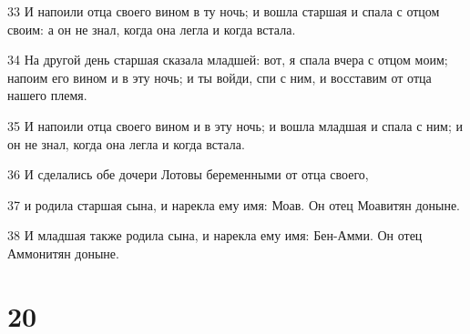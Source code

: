 \par 33 И напоили отца своего вином в ту ночь; и вошла старшая и спала с отцом своим: а он не знал, когда она легла и когда встала.
\par 34 На другой день старшая сказала младшей: вот, я спала вчера с отцом моим; напоим его вином и в эту ночь; и ты войди, спи с ним, и восставим от отца нашего племя.
\par 35 И напоили отца своего вином и в эту ночь; и вошла младшая и спала с ним; и он не знал, когда она легла и когда встала.
\par 36 И сделались обе дочери Лотовы беременными от отца своего,
\par 37 и родила старшая сына, и нарекла ему имя: Моав. Он отец Моавитян доныне.
\par 38 И младшая также родила сына, и нарекла ему имя: Бен-Амми. Он отец Аммонитян доныне.

\chapter{20}

